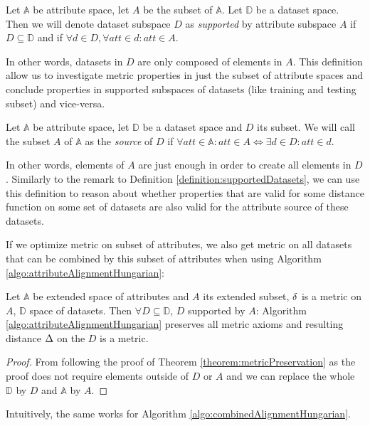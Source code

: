 \begin{definition}
\label{definition:supportedDatasets}
Let $\mathbb{A}$ be attribute space, let $A$ be the subset of $\mathbb{A}$. Let $\mathbb{D}$ be a dataset space. Then we will denote dataset subspace $D$ as \emph{supported} by attribute subspace $A$ if $D \subseteq \mathbb{D}$ and if $\forall d \in D,\forall att \in d:att \in A$. 
\end{definition} 
In other words, datasets in $D$ are only composed of elements in $A$. This definition allow us to investigate metric properties in just the subset of attribute spaces and conclude properties in supported subspaces of datasets (like training and testing subset) and vice-versa.

\begin{definition}
Let $\mathbb{A}$ be attribute space, let $\mathbb{D}$ be a dataset space and $D$ its subset. We will call the subset $A$ of $\mathbb{A}$ as the \emph{source} of $D$ if $\forall att \in \mathbb{A}: att \in A \iff \exists d \in D: att \in d$. 
\end{definition} 
In other words, elements of $A$ are just enough in order to create all elements in $D$. Similarly to the remark to Definition \ref{definition:supportedDatasets}, we can use this definition to reason about whether properties that are valid for some distance function on some set of datasets are also valid for the attribute source of these datasets.

If we optimize metric on subset of attributes, we also get metric on all datasets that can be combined by this subset of attributes when using Algorithm \ref{algo:attributeAlignmentHungarian}:
\begin{theorem}
\label{theorem:metricPreservationSuportedSpaces}
Let $\mathbb{A}$ be extended space of attributes and $A$ its extended subset, $\delta$ is a metric on $A$, $\mathbb{D}$ space of datasets. Then $\forall D \subseteq \mathbb{D}$, $D$ supported by $A$: Algorithm \ref{algo:attributeAlignmentHungarian} preserves all metric axioms and resulting distance $\Delta$ on the $D$ is a metric.
	\begin{proof}
	From following the proof of Theorem \ref{theorem:metricPreservation} as the proof does not require elements outside of $D$ or $A$ and we can replace the whole $\mathbb{D}$ by $D$ and $\mathbb{A}$ by $A$.
	\end{proof}
\end{theorem}
Intuitively, the same works for Algorithm \ref{algo:combinedAlignmentHungarian}.


